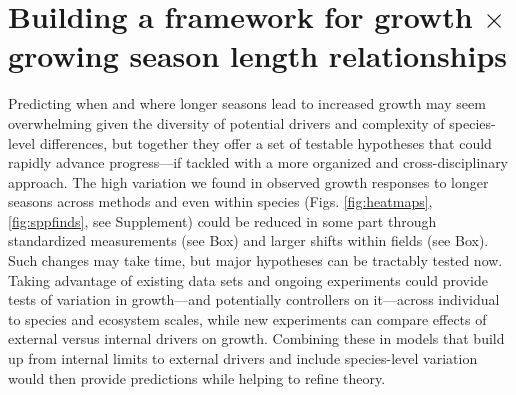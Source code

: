 \documentclass[11pt]{article}
\begin{document}
\section*{Building a framework for growth $\times$ growing season length relationships} %
Predicting when and where longer seasons lead to increased growth may seem overwhelming given the diversity of potential drivers and complexity of species-level differences, but together they offer a set of testable hypotheses that could rapidly advance progress---if tackled with a more organized and cross-disciplinary approach. The high variation we found in observed growth responses to longer seasons across methods and even within species (Figs. \ref{fig:heatmaps},\ref{fig:sppfinds}, see Supplement) could be reduced in some part through standardized measurements (see Box) and larger shifts within fields (see Box). Such changes may take time, but major hypotheses can be tractably tested now. Taking advantage of existing data sets and ongoing experiments could provide tests of variation in growth---and potentially controllers on it---across individual to species and ecosystem scales, while new experiments can compare effects of external versus internal drivers on growth. Combining these in models that build up from internal limits to external drivers and include species-level variation would then provide predictions while helping to refine theory. 

\end{document}
